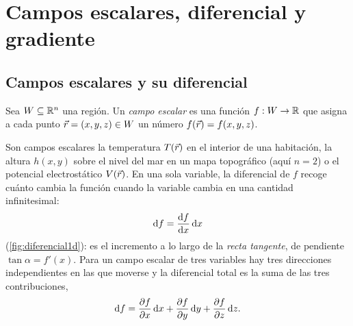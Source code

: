 \section{Campos escalares, diferencial y gradiente}\label{sec:campos}

\subsection{Campos escalares y su diferencial}\label{sec:escalares}
\begin{definicion}\label{def:escalar}
Sea $W\subseteq\mathbb{R}^{n}$ una región. Un \emph{campo escalar} es una función
$f:W\to\mathbb{R}$ que asigna a cada punto $\vec{r}=(x,y,z)\in W$ un número
$f(\vec{r})=f(x,y,z)$.
\end{definicion}

Son campos escalares la temperatura $T(\vec{r})$ en el interior de una
habitación, la altura $h(x,y)$ sobre el nivel del mar en un mapa topográfico
(aquí $n=2$) o el potencial electrostático $V(\vec{r})$. En una sola
variable, la diferencial de $f$ recoge cuánto cambia la función cuando la
variable cambia en una cantidad infinitesimal:
\begin{equation}\label{eq:df1d}
  \mathrm{d} f=\frac{\mathrm{d} f}{\mathrm{d} x}\,\mathrm{d} x
\end{equation}
(\cref{fig:diferencial1d}): es el incremento a lo largo de la \emph{recta
tangente}, de pendiente $\tan\alpha=f'(x)$. Para un campo escalar de tres
variables hay tres direcciones independientes en las que moverse y la
diferencial total es la suma de las tres contribuciones,
\begin{equation}\label{eq:df3d}
  \mathrm{d} f=\frac{\partial f}{\partial x}\,\mathrm{d} x+\frac{\partial f}{\partial y}\,\mathrm{d} y+\frac{\partial f}{\partial z}\,\mathrm{d} z .
\end{equation}


